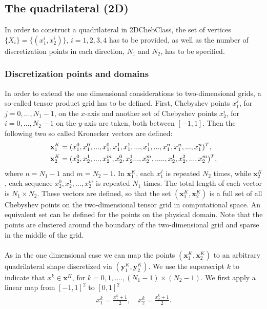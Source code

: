 \subsection{The quadrilateral (2D)}
In order to construct a quadrilateral in 2DChebClass, the set of vertices $\{X_i\} = \{(x_1^i,x_2^i)\}$, $i = 1,2,3,4$ has to be provided, as well as the number of discretization points in each direction, $N_1$ and $N_2$, has to be specified.
\subsubsection{Discretization points and domains}
In order to extend the one dimensional considerations to two-dimensional grids, a so-called tensor product grid has to be defined. First, Chebyshev points $x_1^j$, for $j=0,...,N_1-1$, on the $x$-axis and another set of Chebyshev points $x_2^i$, for $i=0,...,N_2-1$ on the $y$-axis are taken, both between $[-1,1]$. 
Then the following two so called Kronecker vectors are defined:
\begin{align}\label{eq:KroneckerVec}
	\mathbf{x}_1^{K}&=(x_1^0,x_1^0,...,x_1^0,x_1^1,x_1^1,...,x_1^1,...,x_1^n,x_1^n,...,x_1^n)^T,\\
	\mathbf{x}_2^{K}&=(x_2^0,x_2^1,...,x_2^m,x_2^0,x_2^1...,x_2^m,.....,x_2^1,x_2^2,...,x_2^m)^T,\notag
\end{align} 
where $n = N_1 - 1$ and $m = N_2 -1$.
In $\mathbf{x}_1^{K}$, each $x_1^j$ is repeated $N_2$ times, while $\mathbf{x}_2^{K}$, each sequence $x_2^0,x_2^1,...,x_2^m$ is repeated $N_1$ times. The total length of each vector is $N_1 \times N_2$. 
These vectors are defined, so that the set $(\mathbf{x}_1^{K},\mathbf{x}_2^{K})$ is a full set of all Chebyshev points on the two-dimensional tensor grid in computational space. An equivalent set can be defined for the points on the physical domain. Note that the points are clustered around the boundary of the two-dimensional grid and sparse in the middle of the grid.
\\
\\
As in the one dimensional case we can map the points $(\mathbf{x}_1^{K},\mathbf{x}_2^{K})$ to an arbitrary quadrilateral shape discretized via $(\mathbf{y}_1^{K},\mathbf{y}_2^{K})$. We use the superscript $k$ to indicate that $x^k \in \mathbf{x}^{K}$, for $k = 0,1,....,(N_1 - 1)\times (N_2 - 1)$. We first apply a linear map from $[-1,1]^2$ to $[0,1]^2$ 
\begin{align*}
	x_1^k = \frac{x_1^k+1}{2}, \quad
	x_2^k = \frac{x_2^k+1}{2}.
\end{align*}
